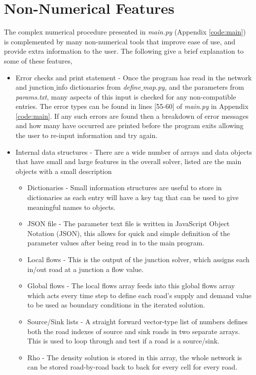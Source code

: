 \section{Non-Numerical Features}

	The complex numerical procedure presented in \emph{main.py} (Appendix \ref{code:main}) is complemented by many non-numerical tools that improve ease of use, and provide extra information to the user. The following give a brief explanation to some of these features,
	\begin{itemize}
		\item Error checks and print statement - Once the program has read in the network and junction$\_$info dictionaries from \emph{define$\_$map.py}, and the parameters from \emph{params.txt}, many aspects of this input is checked for any non-compatible entries. The error types can be found in lines [55-60] of \emph{main.py} in Appendix \ref{code:main}. If any such errors are found then a breakdown of error messages and how many have occurred are printed before the program exits allowing the user to re-input information and try again. 
		\item Internal data structures - There are a wide number of arrays and data objects that have small and large features in the overall solver, listed are the main objects with a small description
		\begin{itemize}
			\item Dictionaries - Small information structures are useful to store in dictionaries as each entry will have a key tag that can be used to give meaningful names to objects.
			\item JSON file - The parameter text file is written in JavaScript Object Notation (JSON), this allows for quick and simple definition of the parameter values after being read in to the main program.
			\item Local flows - This is the output of the junction solver, which assigns each in/out road at a junction a flow value.
			\item Global flows - The local flows array feeds into this global flows array which acts every time step to define each road's supply and demand value to be used as boundary conditions in the iterated solution. 
			\item Source/Sink lists - A straight forward vector-type list of numbers defines both the road indexes of source and sink roads in two separate arrays. This is used to loop through and test if a road is a source/sink.
			\item Rho - The density solution is stored in this array, the whole network is can be stored road-by-road back to back for every cell for every road.

\end{itemize}
\end{itemize}
